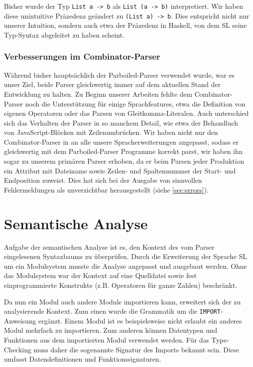\documentclass[runningheads]{llncs}
\begin{document}
Bisher wurde der Typ \verb|List a -> b| als \verb|List (a -> b)|
interpretiert.  Wir haben diese unintuitive Präzedenz geändert zu
\verb|(List a) -> b|.  Dies entspricht nicht nur unserer Intuition,
sondern auch etwa der Präzedenz in Haskell, von dem SL seine
Typ-Syntax abgeleitet zu haben scheint. 

\subsubsection{Verbesserungen im Combinator-Parser}

Während bisher hauptsächlich der Parboiled-Parser verwendet wurde, war
es unser Ziel, beide Parser gleichwertig immer auf dem aktuellen Stand
der Entwicklung zu halten.  Zu Beginn unserer Arbeiten fehlte dem
Combinator-Parser noch die Unterstützung für einige Sprachfeatures,
etwa die Definition von eigenen Operatoren oder das Parsen von
Gleitkomma-Literalen.  Auch unterschied sich das Verhalten der Parser
in so manchem Detail, wie etwa der Behandluch von JavaScript-Blöcken
mit Zeilenumbrüchen.  Wir haben nicht nur den Combinator-Parser in
an alle unsere Spracherweiterungen angepasst, sodass er gleichwertig
mit dem Parboiled-Parser Programme korrekt parst, wir haben ihn sogar
zu unserem primären Parser erhoben, da er beim Parsen jeder Produktion
ein Attribut mit Dateiname sowie Zeilen- und Spaltennummer der Start-
und Endposition zuweist.  Dies hat sich bei der Ausgabe von sinnvollen
Fehlermeldungen als unverzichtbar herausgestellt (siehe
\ref{sec:errors}).

\section{Semantische Analyse}
\label{sec:semantics}

Aufgabe der semantischen Analyse ist es, den Kontext des vom Parser eingelesenen Syntaxbaums zu überprüfen. Durch die Erweiterung der Sprache SL um ein Modulsystem musste die Analyse angepasst und ausgebaut werden. Ohne das Modulsystem war der Kontext auf eine Quelldatei sowie fest einprogrammierte Konstrukte (z.B. Operatoren für ganze Zahlen) beschränkt.

Da nun ein Modul auch andere Module importieren kann, erweitert sich der zu analysierende Kontext. Zum einen wurde die Grammatik um die \verb|IMPORT|-Anweisung ergänzt. Einem Modul ist es beispielsweise nicht erlaubt ein anderes Modul mehrfach zu importieren. Zum anderen können Datentypen und Funktionen aus dem importierten Modul verwendet werden. Für das Type-Checking muss daher die sogenannte Signatur des Imports bekannt sein. Diese umfasst Datendefinitionen und Funktionssignaturen.
\end{document}
